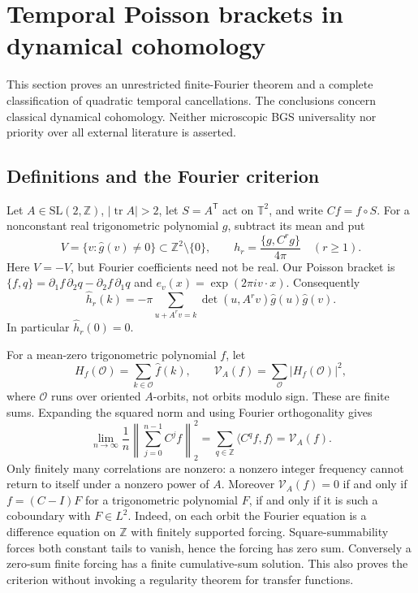 \section{Temporal Poisson brackets in dynamical cohomology}
\label{sec:temporal-resonance}
This section proves an unrestricted finite-Fourier theorem and a complete
classification of quadratic temporal cancellations. The conclusions concern
classical dynamical cohomology. Neither microscopic BGS universality nor
priority over all external literature is asserted.

\subsection{Definitions and the Fourier criterion}
Let $A\in\mathrm{SL}(2,\mathbb Z)$, $|\operatorname{tr}A|>2$, let
$S=A^{\mathsf T}$ act on $\mathbb T^2$, and write $Cf=f\circ S$.
For a nonconstant real trigonometric polynomial $g$, subtract its mean and put
\[
 V=\{v:\widehat g(v)\ne0\}\subset\mathbb Z^2\setminus\{0\},
 \qquad h_r=\frac{\{g,C^rg\}}{4\pi}\quad(r\ge1).
\]
Here $V=-V$, but Fourier coefficients need not be real. Our Poisson bracket is
$\{f,q\}=\partial_1f\,\partial_2q-\partial_2f\,\partial_1q$ and
$e_v(x)=\exp(2\pi i v\cdot x)$. Consequently
\begin{equation}\label{eq:temporal-coeff}
 \widehat h_r(k)=-\pi\sum_{u+A^rv=k}
       \det(u,A^rv)\widehat g(u)\widehat g(v).
\end{equation}
In particular $\widehat h_r(0)=0$.

For a mean-zero trigonometric polynomial $f$, let
\[
 H_f(\mathcal O)=\sum_{k\in\mathcal O}\widehat f(k),\qquad
 \mathcal V_A(f)=\sum_{\mathcal O}|H_f(\mathcal O)|^2,
\]
where $\mathcal O$ runs over oriented $A$-orbits, not orbits modulo sign.
These are finite sums. Expanding the squared norm and using Fourier
orthogonality gives
\[
 \lim_{n\to\infty}\frac1n\left\|\sum_{j=0}^{n-1}C^jf\right\|_2^2
 =\sum_{q\in\mathbb Z}\langle C^qf,f\rangle
 =\mathcal V_A(f).
\]
Only finitely many correlations are nonzero: a nonzero integer frequency
cannot return to itself under a nonzero power of $A$.
Moreover $\mathcal V_A(f)=0$ if and only if $f=(C-I)F$ for a trigonometric
polynomial $F$, if and only if it is such a coboundary with $F\in L^2$.
Indeed, on each orbit the Fourier equation is a difference equation on
$\mathbb Z$ with finitely supported forcing. Square-summability forces both
constant tails to vanish, hence the forcing has zero sum. Conversely a
zero-sum finite forcing has a finite cumulative-sum solution. This also proves
the criterion without invoking a regularity theorem for transfer functions.


